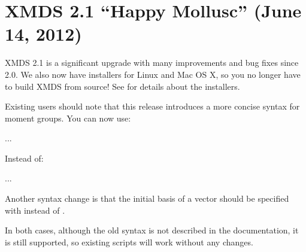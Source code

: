 \documentclass[letterpaper,10pt,english]{sphinxmanual}
\begin{document}
\section{XMDS 2.1 “Happy Mollusc” (June 14, 2012)}
\label{\detokenize{news:xmds-2-1-happy-mollusc-june-14-2012}}
\sphinxAtStartPar
XMDS 2.1 is a significant upgrade with many improvements and bug fixes since 2.0. We also now have installers for Linux and Mac OS X, so you no longer have to build XMDS from source! See {\hyperref[\detokenize{installation:installation}]{}} for details about the installers.

\sphinxAtStartPar
Existing users should note that this release introduces a more concise syntax for moment groups.  You can now use:

\begin{sphinxVerbatim}[commandchars=\\\{\}]
  
    ...
\end{sphinxVerbatim}

\sphinxAtStartPar
Instead of:

\begin{sphinxVerbatim}[commandchars=\\\{\}]
      
        ...
\end{sphinxVerbatim}

\sphinxAtStartPar
Another syntax change is that the initial basis of a vector should be specified with  instead of .

\sphinxAtStartPar
In both cases, although the old syntax is not described in the documentation, it is still supported, so existing scripts will work without any changes.
\end{document}
